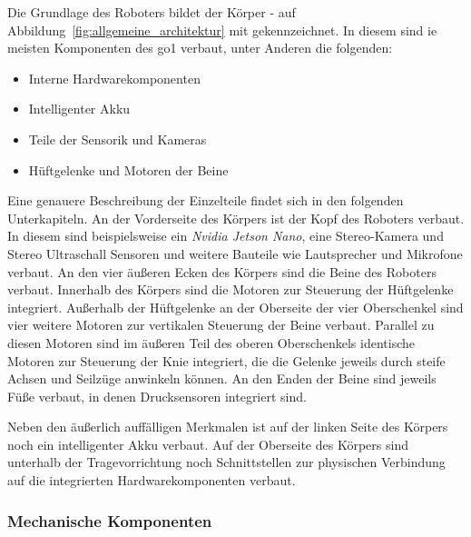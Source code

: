Die Grundlage des Roboters bildet der Körper - auf Abbildung~\ref{fig:allgemeine_architektur} mit  gekennzeichnet.
In diesem sind ie meisten Komponenten des \gls{go1} verbaut, unter Anderen die folgenden:
\begin{itemize}
    \item Interne Hardwarekomponenten
    \item Intelligenter Akku
    \item Teile der Sensorik und Kameras
    \item Hüftgelenke und Motoren der Beine
\end{itemize}
Eine genauere Beschreibung der Einzelteile findet sich in den folgenden Unterkapiteln.
An der Vorderseite des Körpers ist der Kopf  des Roboters verbaut.
In diesem sind beispielsweise ein \emph{Nvidia Jetson Nano}, eine Stereo-Kamera und Stereo Ultraschall Sensoren
und weitere Bauteile wie Lautsprecher und Mikrofone verbaut.
An den vier äußeren Ecken des Körpers sind die Beine des Roboters verbaut.
Innerhalb des Körpers sind die Motoren zur Steuerung der Hüftgelenke  integriert.
Außerhalb der Hüftgelenke an der Oberseite der vier Oberschenkel  sind vier weitere Motoren
zur vertikalen Steuerung der Beine verbaut.
Parallel zu diesen Motoren sind im äußeren Teil des oberen Oberschenkels identische Motoren
zur Steuerung der Knie  integriert, die die Gelenke jeweils durch steife Achsen und Seilzüge
anwinkeln können.
An den Enden der Beine sind jeweils Füße  verbaut, in denen Drucksensoren integriert sind.

Neben den äußerlich auffälligen Merkmalen ist auf der linken Seite des Körpers noch ein intelligenter Akku
 verbaut.
Auf der Oberseite des Körpers sind unterhalb der Tragevorrichtung  noch Schnittstellen  zur physischen
Verbindung auf die integrierten Hardwarekomponenten verbaut.


\subsubsection{Mechanische Komponenten}

